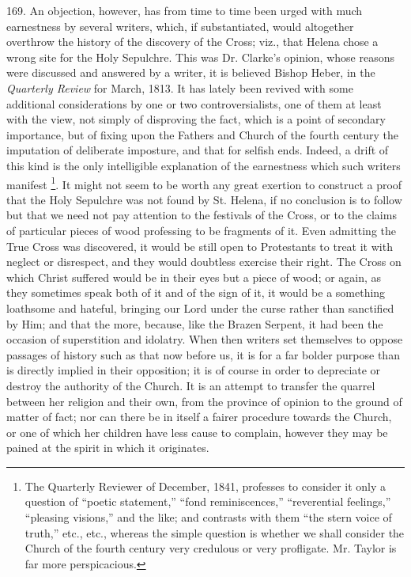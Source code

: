 169.
An objection, however, has from time to time been urged with much
earnestness by several writers, which, if substantiated, would
altogether overthrow the history of the discovery of the Cross; viz.,
that Helena chose a wrong site for the Holy Sepulchre. This was Dr.
Clarke's opinion, whose reasons were discussed and answered by a
writer, it is believed Bishop Heber, in the \emph{Quarterly Review}
for March, 1813. It has lately been revived with some additional
considerations by one or two controversialists, one of them at least
with the view, not simply of disproving the fact, which is a point of
secondary importance, but of fixing upon the Fathers and Church of the
fourth century the imputation of deliberate imposture, and that for
selfish ends. Indeed, a drift of this kind is the only intelligible
explanation of the earnestness which such writers manifest \footnote{The Quarterly Reviewer of December, 1841, professes to consider it
only a question of ``poetic statement,'' ``fond reminiscences,'' ``reverential
feelings,'' ``pleasing visions,'' and the like; and contrasts with them ``the
stern voice of truth,'' etc., etc., whereas the simple question is
whether we shall consider the Church of the fourth century very
credulous or very profligate. Mr. Taylor is far more perspicacious.}. It might not seem to be worth any great exertion to construct
a proof that the Holy Sepulchre was not found by St. Helena, if no
conclusion is to follow but that we need not pay attention to the
festivals of the Cross, or to the claims of particular pieces of wood
professing to be fragments of it. Even admitting the True Cross was
discovered, it would be still open to Protestants to treat it with
neglect or disrespect, and they would doubtless exercise their right.
The Cross on which Christ suffered would be in their eyes but a piece
of wood; or again, as they sometimes speak both of it and of the sign
of it, it would be a something loathsome and hateful, bringing our
Lord under the curse rather than sanctified by Him; and that the more,
because, like the Brazen Serpent, it had been the occasion of
superstition and idolatry. When then writers set themselves to oppose
passages of history such as that now before us, it is for a far bolder
purpose than is directly implied in their opposition; it is of course
in order to depreciate or destroy the authority of the Church. It is
an attempt to transfer the quarrel between her religion and
their own, from the province of opinion to the ground of matter of
fact; nor can there be in itself a fairer procedure towards the
Church, or one of which her children have less cause to complain,
however they may be pained at the spirit in which it originates.

